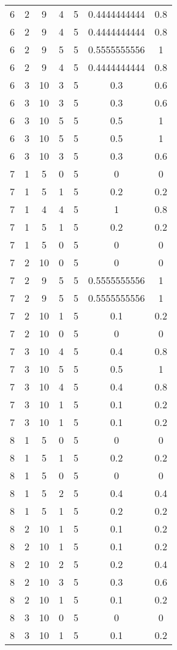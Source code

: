 \begin{longtable}[c]{| c | c | c | c | c | c | c |}
6	&	2	&	9	&	4	&	5	&	0.4444444444	&	0.8	\\
6	&	2	&	9	&	4	&	5	&	0.4444444444	&	0.8	\\
6	&	2	&	9	&	5	&	5	&	0.5555555556	&	1	\\
6	&	2	&	9	&	4	&	5	&	0.4444444444	&	0.8	\\
6	&	3	&	10	&	3	&	5	&	0.3	&	0.6	\\
6	&	3	&	10	&	3	&	5	&	0.3	&	0.6	\\
6	&	3	&	10	&	5	&	5	&	0.5	&	1	\\
6	&	3	&	10	&	5	&	5	&	0.5	&	1	\\
6	&	3	&	10	&	3	&	5	&	0.3	&	0.6	\\
7	&	1	&	5	&	0	&	5	&	0	&	0	\\
7	&	1	&	5	&	1	&	5	&	0.2	&	0.2	\\
7	&	1	&	4	&	4	&	5	&	1	&	0.8	\\
7	&	1	&	5	&	1	&	5	&	0.2	&	0.2	\\
7	&	1	&	5	&	0	&	5	&	0	&	0	\\
7	&	2	&	10	&	0	&	5	&	0	&	0	\\
7	&	2	&	9	&	5	&	5	&	0.5555555556	&	1	\\
7	&	2	&	9	&	5	&	5	&	0.5555555556	&	1	\\
7	&	2	&	10	&	1	&	5	&	0.1	&	0.2	\\
7	&	2	&	10	&	0	&	5	&	0	&	0	\\
7	&	3	&	10	&	4	&	5	&	0.4	&	0.8	\\
7	&	3	&	10	&	5	&	5	&	0.5	&	1	\\
7	&	3	&	10	&	4	&	5	&	0.4	&	0.8	\\
7	&	3	&	10	&	1	&	5	&	0.1	&	0.2	\\
7	&	3	&	10	&	1	&	5	&	0.1	&	0.2	\\
8	&	1	&	5	&	0	&	5	&	0	&	0	\\
8	&	1	&	5	&	1	&	5	&	0.2	&	0.2	\\
8	&	1	&	5	&	0	&	5	&	0	&	0	\\
8	&	1	&	5	&	2	&	5	&	0.4	&	0.4	\\
8	&	1	&	5	&	1	&	5	&	0.2	&	0.2	\\
8	&	2	&	10	&	1	&	5	&	0.1	&	0.2	\\
8	&	2	&	10	&	1	&	5	&	0.1	&	0.2	\\
8	&	2	&	10	&	2	&	5	&	0.2	&	0.4	\\
8	&	2	&	10	&	3	&	5	&	0.3	&	0.6	\\
8	&	2	&	10	&	1	&	5	&	0.1	&	0.2	\\
8	&	3	&	10	&	0	&	5	&	0	&	0	\\
8	&	3	&	10	&	1	&	5	&	0.1	&	0.2	\\

\end{longtable}
